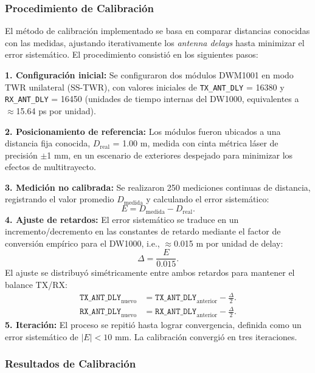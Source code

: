 \subsubsection{Procedimiento de Calibración}

El método de calibración implementado se basa en comparar distancias conocidas con las medidas, ajustando iterativamente los \textit{antenna delays} hasta minimizar el error sistemático. El procedimiento consistió en los siguientes pasos:

\textbf{1. Configuración inicial:} Se configuraron dos módulos DWM1001 en modo TWR unilateral (SS-TWR), con valores iniciales de \texttt{TX\_ANT\_DLY} = 16380 y \texttt{RX\_ANT\_DLY} = 16450 (unidades de tiempo internas del DW1000, equivalentes a $\approx$15.64 ps por unidad).

\textbf{2. Posicionamiento de referencia:} Los módulos fueron ubicados a una distancia fija conocida, $D_{\text{real}}$ = 1.00 m, medida con cinta métrica láser de precisión $\pm$1 mm, en un escenario de exteriores despejado para minimizar los efectos de multitrayecto.

\textbf{3. Medición no calibrada:} Se realizaron 250 mediciones continuas de distancia, registrando el valor promedio $D_{\text{medida}}$ y calculando el error sistemático:
%
\begin{equation}
E = D_{\text{medida}} - D_{\text{real}}.
\end{equation}
%
\textbf{4. Ajuste de retardos:} El error sistemático se traduce en un incremento/decremento en las constantes de retardo mediante el factor de conversión empírico para el DW1000, i.e., $\approx$0.015 m por unidad de delay:
%
\begin{equation}
\Delta = \frac{E}{0.015}.
\end{equation}
%
El ajuste se distribuyó simétricamente entre ambos retardos para mantener el balance TX/RX:
%
\begin{align}
\texttt{TX\_ANT\_DLY}_{\text{nuevo}} &= \texttt{TX\_ANT\_DLY}_{\text{anterior}} - \frac{\Delta}{2}. \\
\texttt{RX\_ANT\_DLY}_{\text{nuevo}} &= \texttt{RX\_ANT\_DLY}_{\text{anterior}} - \frac{\Delta}{2}.
\end{align}
%
\textbf{5. Iteración:} El proceso se repitió hasta lograr convergencia, definida como un error sistemático de $|E| < 10$ mm. La calibración convergió en tres iteraciones.

\subsubsection{Resultados de Calibración}

